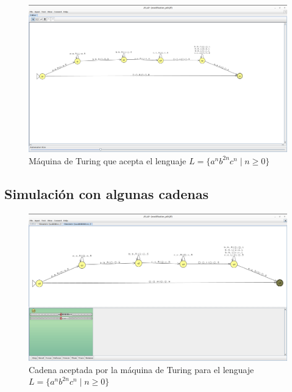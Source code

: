 \documentclass[11pt]{report}
\begin{document}
\begin{figure}[H]
  \centering
  \includegraphics[scale=0.25]{img/MT_modification.png}
  \caption{Máquina de Turing que acepta el lenguaje $L = \{a^nb^{2n}c^n \mid n \geq 0\}$}
\end{figure}

\newpage

\subsection{Simulación con algunas cadenas}
\begin{figure}[H]
  \centering
  \includegraphics[scale=0.25]{img/MT_modification_test_1.png }
  \caption{Cadena aceptada por la máquina de Turing para el lenguaje $L = \{a^nb^{2n}c^n \mid n \geq 0\}$}
\end{figure}
\end{document}
